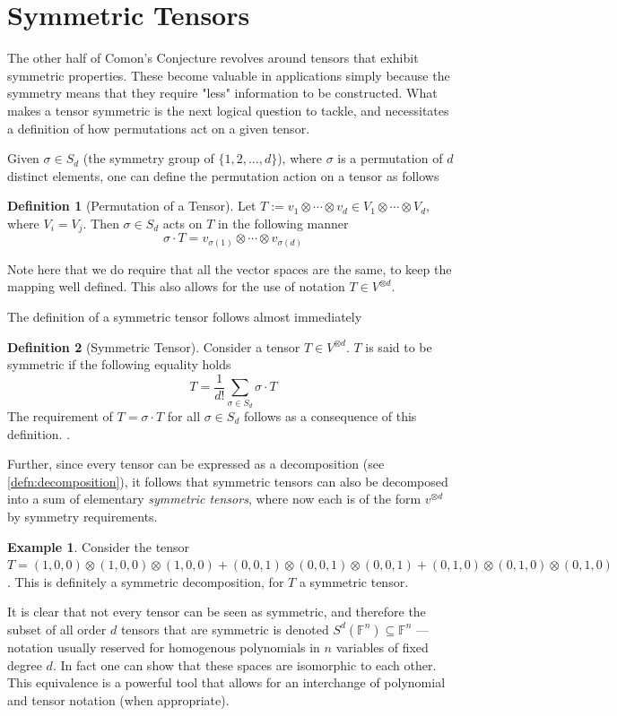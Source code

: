 \documentclass[12pt,a4paper,oneside]{book}
\def\field{\mathbb{F}} %
\theoremstyle{definition}
\newtheorem{definition}{Definition}[section]
\newtheorem{example}{Example}
\begin{document}
\section{Symmetric Tensors}\label{section:symmetrictensors}
The other half of Comon's Conjecture revolves around tensors that exhibit symmetric properties. These become valuable in applications simply because the symmetry means that they require "less" information to be constructed. What makes a tensor symmetric is the next logical question to tackle, and necessitates a definition of how permutations act on a given tensor.

Given $\sigma \in S_d$ (the symmetry group of $\{1, 2, \ldots , d\}$), where $\sigma$ is a permutation of $d$ distinct elements, one can define the permutation action on a tensor as follows
\begin{definition}[Permutation of a Tensor]\label{defn:tensorpermutation}
    Let $T:= v_1 \otimes \cdots \otimes v_d \in V_1 \otimes \cdots \otimes V_d$, where $V_i = V_j$. Then $\sigma \in S_d$ acts on $T$ in the following manner $$\sigma \cdot T = v_{\sigma(1)} \otimes \cdots \otimes v_{\sigma(d)}$$
\end{definition}
Note here that we do require that all the vector spaces are the same, to keep the mapping well defined. 
This also allows for the use of notation $T \in V^{\otimes d}$. 

The definition of a symmetric tensor follows almost immediately 
\begin{definition}[Symmetric Tensor]\label{defn:symmetrictensor}
    Consider a tensor $T \in V^{\otimes d}$. $T$ is said to be symmetric if the following equality holds $$T = \frac{1}{d!} \sum_{\sigma \in S_d} \sigma \cdot T$$The requirement of $T = \sigma \cdot T$ for all $\sigma \in S_d$ follows as a consequence of this definition. \cite{comon_symmetric_2008}.
\end{definition}

Further, since every tensor can be expressed as a decomposition (see \cref{defn:decomposition}), it follows that symmetric tensors can also be decomposed into a sum of elementary \textit{symmetric tensors}, where now each is of the form $v^{\otimes d}$ by symmetry requirements.
\begin{example}
    Consider the tensor $T = (1,0,0) \otimes (1,0,0) \otimes (1,0,0) + (0,0, 1) \otimes (0,0,1) \otimes (0,0,1) + (0,1,0) \otimes (0,1,0) \otimes (0,1,0)$. This is definitely a symmetric decomposition, for $T$ a symmetric tensor.
\end{example}
It is clear that not every tensor can be seen as symmetric, and therefore the subset of all order $d$ tensors that are symmetric is denoted $S^d(\field^n) \subseteq \field^n$ --- notation usually reserved for homogenous polynomials in $n$ variables of fixed degree $d$. In fact one can show that these spaces are isomorphic to each other. This equivalence is a powerful tool that allows for an interchange of polynomial and tensor notation (when appropriate).
\end{document}
